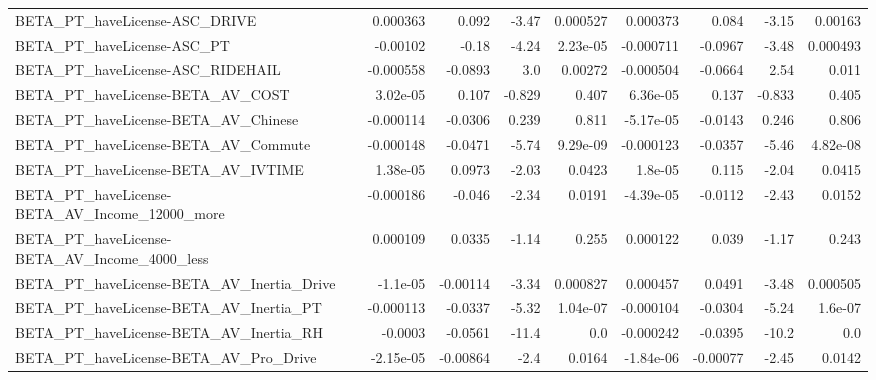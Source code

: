 \begin{tabular}{lrrrrrrrr}
BETA\_PT\_haveLicense-ASC\_DRIVE                      &    0.000363 &        0.092 &    -3.47 & 0.000527 &   0.000373 &       0.084 &        -3.15 &       0.00163 \\
BETA\_PT\_haveLicense-ASC\_PT                         &    -0.00102 &        -0.18 &    -4.24 & 2.23e-05 &  -0.000711 &     -0.0967 &        -3.48 &      0.000493 \\
BETA\_PT\_haveLicense-ASC\_RIDEHAIL                   &   -0.000558 &      -0.0893 &      3.0 &  0.00272 &  -0.000504 &     -0.0664 &         2.54 &         0.011 \\
BETA\_PT\_haveLicense-BETA\_AV\_COST                   &    3.02e-05 &        0.107 &   -0.829 &    0.407 &   6.36e-05 &       0.137 &       -0.833 &         0.405 \\
BETA\_PT\_haveLicense-BETA\_AV\_Chinese                &   -0.000114 &      -0.0306 &    0.239 &    0.811 &  -5.17e-05 &     -0.0143 &        0.246 &         0.806 \\
BETA\_PT\_haveLicense-BETA\_AV\_Commute                &   -0.000148 &      -0.0471 &    -5.74 & 9.29e-09 &  -0.000123 &     -0.0357 &        -5.46 &      4.82e-08 \\
BETA\_PT\_haveLicense-BETA\_AV\_IVTIME                 &    1.38e-05 &       0.0973 &    -2.03 &   0.0423 &    1.8e-05 &       0.115 &        -2.04 &        0.0415 \\
BETA\_PT\_haveLicense-BETA\_AV\_Income\_12000\_more      &   -0.000186 &       -0.046 &    -2.34 &   0.0191 &  -4.39e-05 &     -0.0112 &        -2.43 &        0.0152 \\
BETA\_PT\_haveLicense-BETA\_AV\_Income\_4000\_less       &    0.000109 &       0.0335 &    -1.14 &    0.255 &   0.000122 &       0.039 &        -1.17 &         0.243 \\
BETA\_PT\_haveLicense-BETA\_AV\_Inertia\_Drive          &    -1.1e-05 &     -0.00114 &    -3.34 & 0.000827 &   0.000457 &      0.0491 &        -3.48 &      0.000505 \\
BETA\_PT\_haveLicense-BETA\_AV\_Inertia\_PT             &   -0.000113 &      -0.0337 &    -5.32 & 1.04e-07 &  -0.000104 &     -0.0304 &        -5.24 &       1.6e-07 \\
BETA\_PT\_haveLicense-BETA\_AV\_Inertia\_RH             &     -0.0003 &      -0.0561 &    -11.4 &      0.0 &  -0.000242 &     -0.0395 &        -10.2 &           0.0 \\
BETA\_PT\_haveLicense-BETA\_AV\_Pro\_Drive              &   -2.15e-05 &     -0.00864 &     -2.4 &   0.0164 &  -1.84e-06 &    -0.00077 &        -2.45 &        0.0142 \\

\end{tabular}
